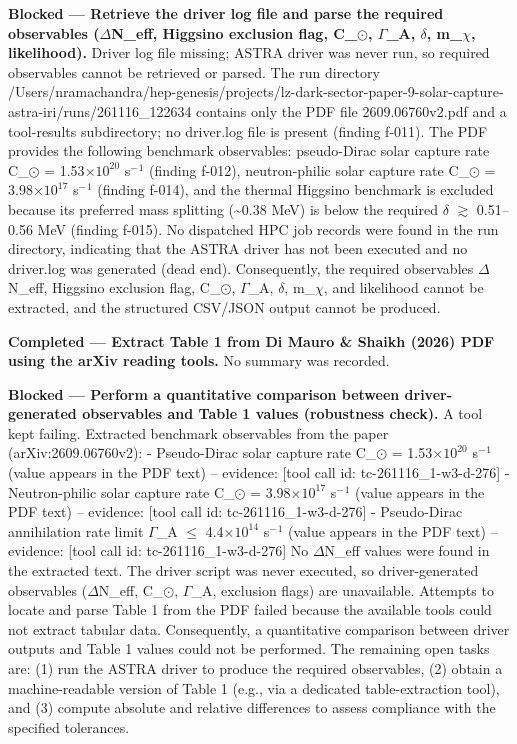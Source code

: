 \documentclass[11pt,a4paper]{article}
\begin{document}
\textbf{Blocked --- Retrieve the driver log file and parse the required observables ($\Delta$N\_eff, Higgsino exclusion flag, C\_$\odot$, $\Gamma$\_A, $\delta$, m\_$\chi$, likelihood).} Driver log file missing; ASTRA driver was never run, so required observables cannot be retrieved or parsed. The run directory /Users/nramachandra/hep-genesis/projects/lz-dark-sector-paper-9-solar-capture-astra-iri/runs/261116\_122634 contains only the PDF file 2609.06760v2.pdf and a tool-results subdirectory; no driver.log file is present (finding f-011). The PDF provides the following benchmark observables: pseudo-Dirac solar capture rate C\_$\odot$ = 1.53$\times$$10^{20}$ s$^-$$^1$ (finding f-012), neutron-philic solar capture rate C\_$\odot$ = 3.98$\times$$10^{17}$ s$^-$$^1$ (finding f-014), and the thermal Higgsino benchmark is excluded because its preferred mass splitting (\textasciitilde{}0.38 MeV) is below the required $\delta$ $\gtrsim$ 0.51--0.56 MeV (finding f-015). No dispatched HPC job records were found in the run directory, indicating that the ASTRA driver has not been executed and no driver.log was generated (dead end). Consequently, the required observables $\Delta$N\_eff, Higgsino exclusion flag, C\_$\odot$, $\Gamma$\_A, $\delta$, m\_$\chi$, and likelihood cannot be extracted, and the structured CSV/JSON output cannot be produced.

\textbf{Completed --- Extract Table 1 from Di Mauro \& Shaikh (2026) PDF using the arXiv reading tools.} No summary was recorded.

\textbf{Blocked --- Perform a quantitative comparison between driver-generated observables and Table 1 values (robustness check).} A tool kept failing. Extracted benchmark observables from the paper (arXiv:2609.06760v2): - Pseudo-Dirac solar capture rate C\_$\odot$ = 1.53$\times$$10^{20}$ s$^-$$^1$ (value appears in the PDF text) -- evidence: [tool call id: tc-261116\_1-w3-d-276] - Neutron-philic solar capture rate C\_$\odot$ = 3.98$\times$$10^{17}$ s$^-$$^1$ (value appears in the PDF text) -- evidence: [tool call id: tc-261116\_1-w3-d-276] - Pseudo-Dirac annihilation rate limit $\Gamma$\_A $\leq$ 4.4$\times$$10^{14}$ s$^-$$^1$ (value appears in the PDF text) -- evidence: [tool call id: tc-261116\_1-w3-d-276] No $\Delta$N\_eff values were found in the extracted text. The driver script was never executed, so driver-generated observables ($\Delta$N\_eff, C\_$\odot$, $\Gamma$\_A, exclusion flags) are unavailable. Attempts to locate and parse Table 1 from the PDF failed because the available tools could not extract tabular data. Consequently, a quantitative comparison between driver outputs and Table 1 values could not be performed. The remaining open tasks are: (1) run the ASTRA driver to produce the required observables, (2) obtain a machine-readable version of Table 1 (e.g., via a dedicated table-extraction tool), and (3) compute absolute and relative differences to assess compliance with the specified tolerances.
\end{document}
